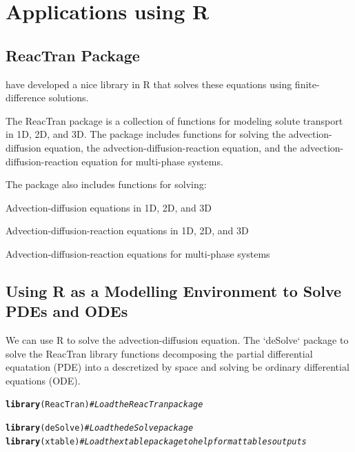 \documentclass{tufte-handout}\usepackage[]{graphicx}\usepackage[]{xcolor}
\makeatletter
\newcommand{\hlcom}[1]{\textcolor[rgb]{0.678,0.584,0.686}{\textit{#1}}}%
\newcommand{\hlstd}[1]{\textcolor[rgb]{0.345,0.345,0.345}{#1}}%
\newcommand{\hlkwd}[1]{\textcolor[rgb]{0.737,0.353,0.396}{\textbf{#1}}}%
\newenvironment{kframe}{%
 \def\at@end@of@kframe{}%
 \ifinner\ifhmode%
  \def\at@end@of@kframe{\end{minipage}}%
  \begin{minipage}{\columnwidth}%
 \fi\fi%
 \def\FrameCommand##1{\hskip\@totalleftmargin \hskip-\fboxsep
 \colorbox{shadecolor}{##1}\hskip-\fboxsep
     \hskip-\linewidth \hskip-\@totalleftmargin \hskip\columnwidth}%
 \MakeFramed {\advance\hsize-\width
   \@totalleftmargin\z@ \linewidth\hsize
   \@setminipage}}%
 {\par\unskip\endMakeFramed%
 \at@end@of@kframe}
\newenvironment{knitrout}{}{} %
\newenvironment{itemize*}%
  {\begin{itemize}%
    \setlength{\itemsep}{0pt}%
    \setlength{\parskip}{0pt}}%
  {\end{itemize}}
\makeatother
\begin{document}
\section{Applications using R}

\subsection{ReacTran Package}

\citet{soetaert2017package} have developed a nice library in R that solves these equations using finite-difference solutions. 

The ReacTran package is a collection of functions for modeling solute transport in 1D, 2D, and 3D. The package includes functions for solving the advection-diffusion equation, the advection-diffusion-reaction equation, and the advection-diffusion-reaction equation for multi-phase systems. 

The package also includes functions for solving:

\begin{itemize*}
\item Advection-diffusion equations in 1D, 2D, and 3D 
\item Advection-diffusion-reaction equations in 1D, 2D, and 3D
\item Advection-diffusion-reaction equations for multi-phase systems
\end{itemize*}

\subsection{Using R as a Modelling Environment to Solve PDEs and ODEs}

We can use R to solve the advection-diffusion equation. The `deSolve` package to solve the ReacTran library functions decomposing the partial differential equatation (PDE) into a descretized by space and solving be ordinary differential equations (ODE). 

\begin{knitrout}
\color{fgcolor}\begin{kframe}
\begin{alltt}
\hlkwd{library}\hlstd{(ReacTran)} \hlcom{# Load the ReacTran package}
\end{alltt}


{\ttfamily\noindent\itshape\color{messagecolor}{\#\# Loading required package: rootSolve}}

{\ttfamily\noindent\itshape\color{messagecolor}{\#\# Loading required package: deSolve}}

{\ttfamily\noindent\itshape\color{messagecolor}{\#\# Loading required package: shape}}\begin{alltt}
\hlkwd{library}\hlstd{(deSolve)} \hlcom{# Load the deSolve package}
\hlkwd{library}\hlstd{(xtable)} \hlcom{# Load the xtable package to help format tables outputs}
\end{alltt}
\end{kframe}
\end{knitrout}
\end{document}
